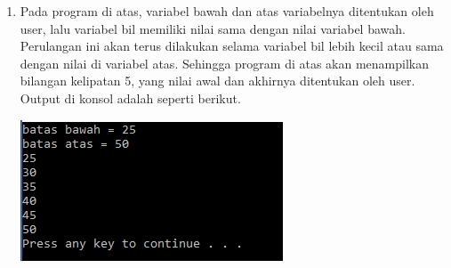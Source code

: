 \documentclass[a4paper,12pt]{article}
\begin{document}
\begin{enumerate}
	\item 
	\begin{minipage}[t]{\linewidth}
		\raggedright
	\end{minipage}
	Pada program di atas, variabel bawah dan atas variabelnya ditentukan oleh user, lalu variabel bil memiliki nilai sama dengan nilai variabel bawah. Perulangan ini akan terus dilakukan selama variabel bil lebih kecil atau sama dengan nilai di variabel atas. Sehingga program di atas akan menampilkan bilangan kelipatan 5, yang nilai awal dan akhirnya ditentukan oleh user.\\
	Output di konsol adalah seperti berikut.
	\begin{center}
		\includegraphics[scale=1]{Capture16}
	\end{center} 
\end{enumerate}
\end{document}
